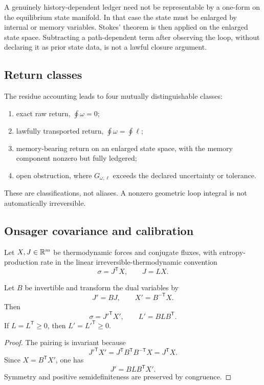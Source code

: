 \begin{remark}
A genuinely history-dependent ledger need not be representable by a one-form on the equilibrium state manifold.  In that case the state must be enlarged by internal or memory variables.  Stokes' theorem is then applied on the enlarged state space.  Subtracting a path-dependent term after observing the loop, without declaring it as prior state data, is not a lawful closure argument.
\end{remark}

\subsection{Return classes}

The residue accounting leads to four mutually distinguishable classes:
\begin{enumerate}[label=\textbf{Class \Roman*:}]
\item exact raw return, $\oint\omega=0$;
\item lawfully transported return, $\oint\omega=\oint\ell$;
\item memory-bearing return on an enlarged state space, with the memory component nonzero but fully ledgered;
\item open obstruction, where $G_{\omega,\ell}$ exceeds the declared uncertainty or tolerance.
\end{enumerate}

These are classifications, not aliases.  A nonzero geometric loop integral is not automatically irreversible.

\subsection{Onsager covariance and calibration}

Let $X,J\in\mathbb R^m$ be thermodynamic forces and conjugate fluxes, with entropy-production rate in the linear irreversible-thermodynamic convention \cite{Onsager1,Onsager2,Casimir}
\[
\sigma=J^{\mathsf T}X,
\qquad
J=LX.
\]

\begin{theorem}
Let $B$ be invertible and transform the dual variables by
\[
J'=BJ,
\qquad
X'=B^{-\mathsf T}X.
\]
Then
\[
\sigma=J'^{\mathsf T}X',
\qquad
L'=BLB^{\mathsf T}.
\]
If $L=L^{\mathsf T}\ge0$, then $L'=L'^{\mathsf T}\ge0$.
\end{theorem}

\begin{proof}
The pairing is invariant because
\[
J'^{\mathsf T}X'=J^{\mathsf T}B^{\mathsf T}B^{-\mathsf T}X=J^{\mathsf T}X.
\]
Since $X=B^{\mathsf T}X'$, one has
\[
J'=BLB^{\mathsf T}X'.
\]
Symmetry and positive semidefiniteness are preserved by congruence.
\end{proof}

